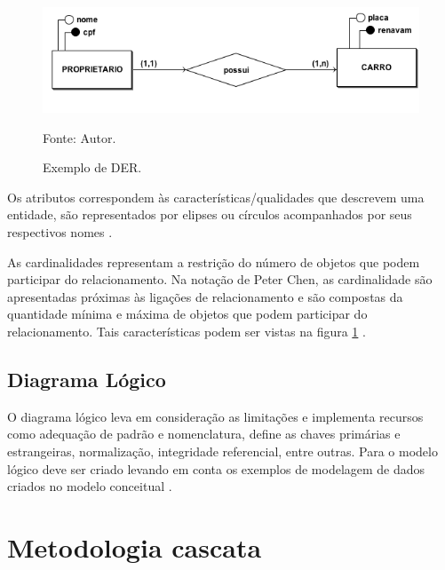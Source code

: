 \begin{figure}[h]
	\centering
	\includegraphics[keepaspectratio=true,scale=0.5]{figuras/figura1.png}
	\caption{Exemplo de DER.}
	Fonte: Autor.
	\label{figura1}
\end{figure}

Os atributos correspondem às características/qualidades que descrevem uma entidade, são representados por
elipses ou círculos acompanhados por seus respectivos nomes \cite{sistemadebancos}.

As cardinalidades representam a restrição do número de objetos que podem participar do relacionamento. Na notação
de Peter Chen, as cardinalidade são apresentadas próximas às ligações de relacionamento e são compostas da quantidade
mínima e máxima de objetos que podem participar do relacionamento. Tais características podem ser vistas 
na figura \ref{figura1} \cite{sistemadebancos}.

\subsection{Diagrama Lógico}
O diagrama lógico leva em consideração as limitações e implementa recursos como adequação de padrão e nomenclatura, define as
chaves primárias e estrangeiras, normalização, integridade referencial, entre outras. Para o modelo lógico deve ser criado 
levando em conta os exemplos de modelagem de dados criados no modelo conceitual \cite{sistemadebancos}.



\section{Metodologia cascata}

